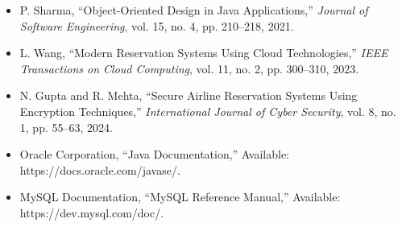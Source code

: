 \begin{itemize}
\item P. Sharma, “Object-Oriented Design in Java Applications,” \textit{Journal of Software Engineering}, vol. 15, no. 4, pp. 210–218, 2021.

\item L. Wang, “Modern Reservation Systems Using Cloud Technologies,” \textit{IEEE Transactions on Cloud Computing}, vol. 11, no. 2, pp. 300–310, 2023.

\item N. Gupta and R. Mehta, “Secure Airline Reservation Systems Using Encryption Techniques,” \textit{International Journal of Cyber Security}, vol. 8, no. 1, pp. 55–63, 2024.

\item Oracle Corporation, “Java Documentation,” Available: https://docs.oracle.com/javase/.

\item MySQL Documentation, “MySQL Reference Manual,” Available: https://dev.mysql.com/doc/.

\end{itemize}
